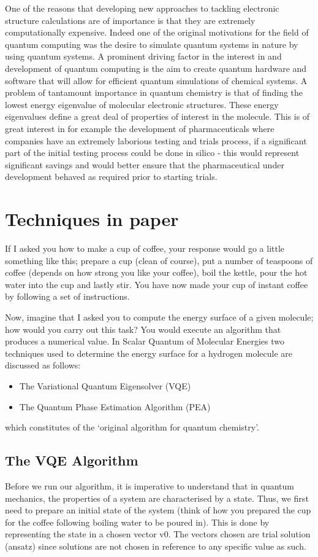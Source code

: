 \documentclass[12pt]{article}
\begin{document}
One of the reasons that developing new approaches to tackling electronic structure calculations are of importance is that they are extremely computationally expensive. Indeed one of the original motivations for the field of quantum computing was the desire to simulate quantum systems in nature by using quantum systems. A prominent driving factor in the interest in and development of quantum computing is the aim to create quantum hardware and software that will allow for efficient quantum simulations of chemical systems. A problem of tantamount importance in quantum chemistry is that of finding the lowest energy eigenvalue of molecular electronic structures. These energy eigenvalues define a great deal of properties of interest in the molecule. This is of great interest in for example the development of pharmaceuticals where companies have an extremely laborious testing and trials process, if a significant part of the initial testing process could be done in silico - this would represent significant savings and would better ensure that the pharmaceutical under development behaved as required prior to starting trials.
\section{Techniques in paper}
If I asked you how to make a cup of coffee, your response would go a little something like this; prepare a cup (clean of course), put a number of teaspoons of coffee (depends on how strong you like your coffee), boil the kettle, pour the hot water into the cup and lastly stir. You have now made your cup of instant coffee by following a set of instructions.
 
Now, imagine that I asked you to compute the energy surface of a given molecule; how would you carry out this task? You would execute an algorithm that produces a numerical value. In Scalar Quantum of Molecular Energies two techniques used to determine the energy surface for a hydrogen molecule are discussed as follows: 
\begin{itemize}
\item The Variational Quantum Eigensolver (VQE)
\item The Quantum Phase Estimation Algorithm (PEA)
\end{itemize}
which constitutes of the ‘original algorithm for quantum chemistry’.

\subsection{The VQE Algorithm}
Before we run our algorithm, it is imperative to understand that in quantum mechanics, the properties of a system are characterised by a state. Thus, we first need to prepare an initial state of the system (think of how you prepared the cup for the coffee following boiling water to be poured in). This is done by representing the state in a chosen vector v­­­­0. The vectors chosen are trial solution (ansatz) since solutions are not chosen in reference to any specific value as such.
 
\end{document}
